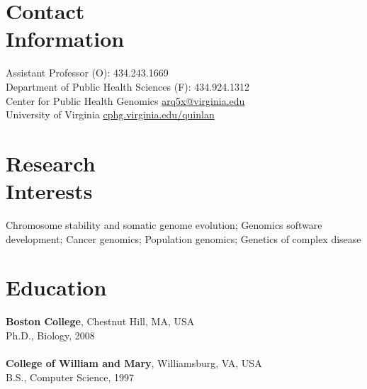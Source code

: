 \documentclass[margin,line]{cv}
\begin{document}
\begin{resume}
    \section{\mysidestyle Contact\\Information}
    Assistant Professor                                                                     \hfill (O): 434.243.1669\\%
    Department of Public Health Sciences                                                    \hfill (F): 434.924.1312\\%
    Center for Public Health Genomics                                                \hfill \url{arq5x@virginia.edu}\\%
    University of Virginia                                                    \hfill \url{cphg.virginia.edu/quinlan}\\%

    \section{\mysidestyle Research\\Interests}

    Chromosome stability and somatic genome evolution; Genomics software development; Cancer genomics;
    Population genomics; Genetics of complex disease 

    \section{\mysidestyle Education}

    \textbf{Boston College}, Chestnut Hill, MA, USA\\
    Ph.D., Biology, 2008\\
    \\
    \textbf{College of William and Mary}, Williamsburg, VA, USA\\
    B.S., Computer Science, 1997



\end{resume}
\end{document}
